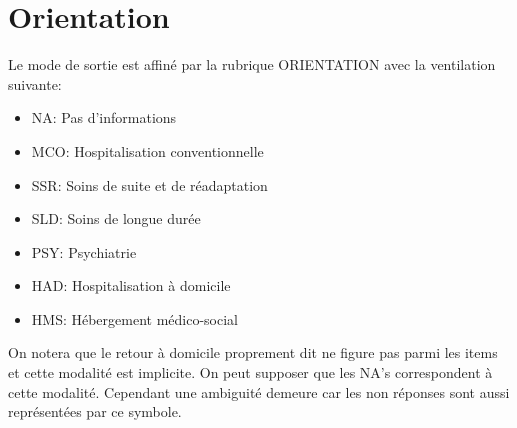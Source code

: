 \documentclass[12pt,english,french,twoside]{report}\usepackage[]{graphicx}\usepackage[]{color}
\begin{document}
\section{Orientation}

Le mode de sortie est affiné par la rubrique ORIENTATION avec la ventilation suivante:

\begin{itemize}
  \item NA:    Pas d'informations
  \item MCO:		Hospitalisation conventionnelle
  \item SSR:		Soins de suite et de réadaptation
  \item SLD:		Soins de longue durée
  \item PSY: 		Psychiatrie
  \item HAD:		Hospitalisation à domicile
  \item HMS:		Hébergement médico-social
\end{itemize}

On notera que le retour à domicile proprement dit ne figure pas parmi les items et cette modalité est implicite. On peut supposer que les NA's correspondent à cette modalité. Cependant une ambiguité demeure car les non réponses sont aussi représentées par ce symbole.
\end{document}
